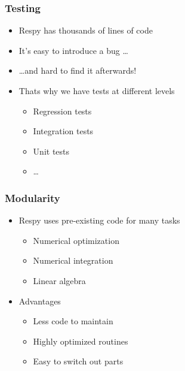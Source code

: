 \documentclass[11pt]{beamer}
\begin{document}
\begin{frame}[c]\frametitle{Testing}
\begin{itemize}
  \item Respy has thousands of lines of code
  \item It's easy to introduce a bug \ldots
  \item[] \hspace{2cm} \ldots and hard to find it afterwards!
  \item Thats why we have tests at different levels
  \begin{itemize}
    \item Regression tests
    \item Integration tests
    \item Unit tests
    \item \ldots
  \end{itemize}
\end{itemize}
\end{frame}



\begin{frame}[t]\frametitle{Modularity}
  \begin{itemize}
    \item Respy uses pre-existing code for many tasks
    \begin{itemize}
      \item Numerical optimization
      \item Numerical integration
      \item Linear algebra
    \end{itemize}
    \item Advantages
    \begin{itemize}
      \item Less code to maintain
      \item Highly optimized routines
      \item Easy to switch out parts
    \end{itemize}
  \end{itemize}
\end{frame}
\end{document}
